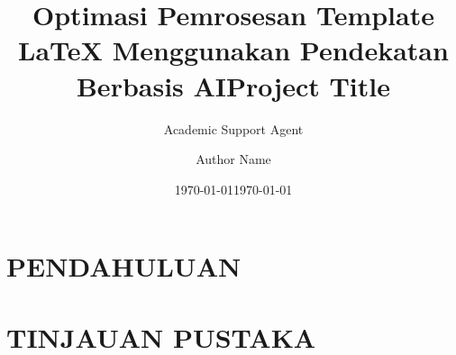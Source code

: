 \documentclass{report}
\title{Optimasi Pemrosesan Template LaTeX Menggunakan Pendekatan Berbasis AI}
\author{Academic Support Agent}
\date{\today}
\begin{document}
\maketitle

\begin{abstract}

\end{abstract}

\chapter{PENDAHULUAN}


\chapter{TINJAUAN PUSTAKA}


\usepackage{report}

\usepackage[acronym]{glossaries}
\usepackage{rotating}
\usepackage{float}
\usepackage{siunitx}
\usepackage{array}
\usepackage[justification=centering]{caption}
\captionsetup[figure]{font=small}
\usepackage{booktabs}
\usepackage[table,xcdraw]{xcolor}
\usepackage{chngcntr}
\usepackage[utf8]{inputenc}
\usepackage{listings}
\usepackage{subcaption}
\usepackage{indentfirst}
\usepackage{enumitem}
\usepackage{booktabs}
\usepackage{multirow}
\usepackage{flafter}
\usepackage{hyperref}
\usepackage[outputdir=../]{minted}
\usepackage{lipsum}


\hypersetup{
    colorlinks=true,
    linkcolor=blue,
    filecolor=magenta,      
    urlcolor=blue,
    citecolor=blue,
    pdfpagemode=FullScreen,
}


\setcounter{secnumdepth}{3} %
\setlength{\cfttabindent}{0pt} %
\setlength{\cftfigindent}{0pt} %

\title{Project Title}
\author{Author Name}

\date{\today}
\end{document}
